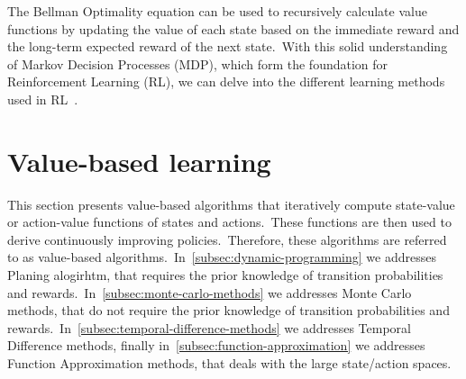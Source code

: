 \documentclass[../xlapes02]{subfiles}
\begin{document}
    The Bellman Optimality equation can be used to recursively calculate value functions by updating the value of each state based on the immediate reward and the long-term expected reward of the next state.\ With this solid understanding of Markov Decision Processes (MDP), which form the foundation for Reinforcement Learning (RL), we can delve into the different learning methods used in RL~\cite{sutton2018reinforcement}.


    \section{Value-based learning}\label{sec:value-based-learning}
    This section presents value-based algorithms that iteratively compute state-value or action-value functions of states and actions.\ These functions are then used to derive continuously improving policies.\ Therefore, these algorithms are referred to as value-based algorithms.\ In~\cref{subsec:dynamic-programming} we addresses Planing alogirhtm, that requires the prior knowledge of transition probabilities and rewards.\ In~\cref{subsec:monte-carlo-methods} we addresses Monte Carlo methods, that do not require the prior knowledge of transition probabilities and rewards.\ In~\cref{subsec:temporal-difference-methods} we addresses Temporal Difference methods, finally in~\cref{subsec:function-approximation} we addresses Function Approximation methods, that deals with the large state/action spaces.

\end{document}
